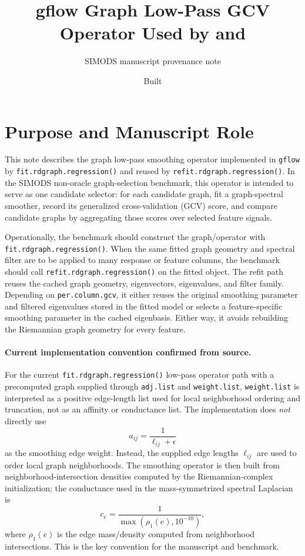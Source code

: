 \documentclass[11pt]{article}
\title{gflow Graph Low-Pass GCV Operator Used by \code{fit.rdgraph.regression()} and \code{refit.rdgraph.regression()}}
\author{SIMODS manuscript provenance note}
\date{Built \reportbuilddatetime}
\newcommand{\code}[1]{\texttt{#1}}
\begin{document}
\maketitle

\section{Purpose and Manuscript Role}

This note describes the graph low-pass smoothing operator implemented in
\code{gflow} by \code{fit.rdgraph.regression()} and reused by
\code{refit.rdgraph.regression()}. In the SIMODS non-oracle graph-selection
benchmark, this operator is intended to serve as one candidate selector: for
each candidate graph, fit a graph-spectral smoother, record its generalized
cross-validation (GCV) score, and compare candidate graphs by aggregating those
scores over selected feature signals.

Operationally, the benchmark should construct the graph/operator with
\code{fit.rdgraph.regression()}. When the same fitted graph geometry and
spectral filter are to be applied to many response or feature columns, the
benchmark should call \code{refit.rdgraph.regression()} on the fitted object.
The refit path reuses the cached graph geometry, eigenvectors, eigenvalues, and
filter family. Depending on \code{per.column.gcv}, it either reuses the
original smoothing parameter and filtered eigenvalues stored in the fitted model
or selects a feature-specific smoothing parameter in the cached eigenbasis.
Either way, it avoids rebuilding the Riemannian graph geometry for every
feature.

\paragraph{Current implementation convention confirmed from source.}
For the current \code{fit.rdgraph.regression()} low-pass operator path with a
precomputed graph supplied through \code{adj.list} and \code{weight.list},
\code{weight.list} is interpreted as a positive edge-length list used for local
neighborhood ordering and truncation, not as an affinity or conductance list.
The implementation does \emph{not} directly use
\[
  a_{ij} = \frac{1}{\ell_{ij}+\epsilon}
\]
as the smoothing edge weight. Instead, the supplied edge lengths
\(\ell_{ij}\) are used to order local graph neighborhoods. The smoothing
operator is then built from neighborhood-intersection densities computed by the
Riemannian-complex initialization; the conductance used in the
mass-symmetrized spectral Laplacian is
\[
  c_e = \frac{1}{\max(\rho_1(e),10^{-10})},
\]
where \(\rho_1(e)\) is the edge mass/density computed from neighborhood
intersections. This is the key convention for the manuscript and benchmark.
\end{document}

